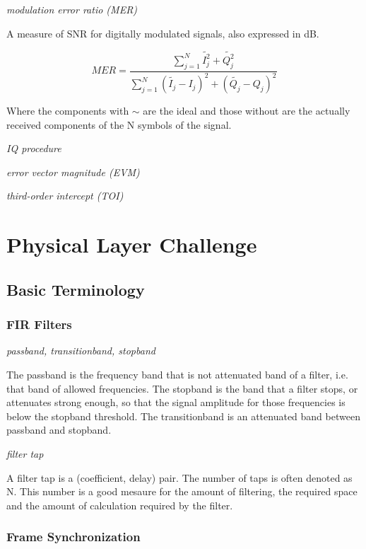 \documentclass{article}
\begin{document}
\bigskip
 
\emph{modulation error ratio (MER)}

A measure of SNR for digitally modulated signals, also expressed in dB.

$$
	MER = \frac{\sum_{j=1}^{N} \tilde{I_j^2}+\tilde{Q_j^2}}{\sum_{j=1}^{N} (\tilde{I_j}-I_j)^2+(\tilde{Q_j}-Q_j)^2}
$$

Where the components with $\sim$ are the ideal and those without are the actually received components of the N symbols of the signal.

\bigskip

\emph{IQ procedure}

\bigskip

\emph{error vector magnitude (EVM)}

\bigskip

\emph{third-order intercept (TOI)}

\section{Physical Layer Challenge}

\subsection{Basic Terminology}

\subsubsection{FIR Filters}

\emph{passband, transitionband, stopband}

The passband is the frequency band that is not attenuated band of a filter, i.e. that band of allowed frequencies. The stopband is the band that a filter stops, or attenuates strong enough, so that the signal amplitude for those frequencies is below the stopband threshold. The transitionband is an attenuated band between passband and stopband.  

\bigskip

\emph{filter tap}

A filter tap is a (coefficient, delay) pair. The number of taps is often denoted as N. This number is a good mesaure for the amount of filtering, the required space and the amount of calculation required by the filter. 

\subsubsection{Frame Synchronization}
\end{document}
